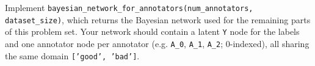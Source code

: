 \item {}

Implement \texttt{bayesian\_network\_for\_annotators(num\_annotators, dataset\_size)}, which returns the Bayesian network used for the remaining parts of this problem set. Your network should contain a latent \texttt{Y} node for the labels and one annotator node per annotator (e.g. \texttt{A\_0}, \texttt{A\_1}, \texttt{A\_2}; 0-indexed), all sharing the same domain \texttt{['good', 'bad']}.

